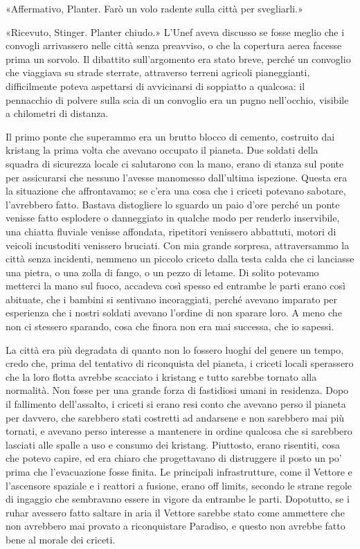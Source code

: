 «Affermativo, Planter. Farò un volo radente sulla città per svegliarli.»

«Ricevuto, Stinger. Planter chiudo.» L'Unef aveva discusso se fosse
meglio che i convogli arrivassero nelle città senza preavviso, o che la
copertura aerea facesse prima un sorvolo. Il dibattito sull'argomento
era stato breve, perché un convoglio che viaggiava su strade sterrate,
attraverso terreni agricoli pianeggianti, difficilmente poteva
aspettarsi di avvicinarsi di soppiatto a qualcosa: il pennacchio di
polvere sulla scia di un convoglio era un pugno nell'occhio, visibile a
chilometri di distanza.

Il primo ponte che superammo era un brutto blocco di cemento, costruito
dai kristang la prima volta che avevano occupato il pianeta. Due soldati
della squadra di sicurezza locale ci salutarono con la mano, erano di
stanza sul ponte per assicurarsi che nessuno l'avesse manomesso
dall'ultima ispezione. Questa era la situazione che affrontavamo; se
c'era una cosa che i criceti potevano sabotare, l'avrebbero fatto.
Bastava distogliere lo sguardo un paio d'ore perché un ponte venisse
fatto esplodere o danneggiato in qualche modo per renderlo inservibile,
una chiatta fluviale venisse affondata, ripetitori venissero abbattuti,
motori di veicoli incustoditi venissero bruciati. Con mia grande
sorpresa, attraversammo la città senza incidenti, nemmeno un piccolo
criceto dalla testa calda che ci lanciasse una pietra, o una zolla di
fango, o un pezzo di letame. Di solito potevamo metterci la mano sul
fuoco, accadeva così spesso ed entrambe le parti erano così abituate,
che i bambini si sentivano incoraggiati, perché avevano imparato per
esperienza che i nostri soldati avevano l'ordine di non sparare loro. A
meno che non ci stessero sparando, cosa che finora non era mai successa,
che io sapessi.

La città era più degradata di quanto non lo fossero luoghi del genere un
tempo, credo che, prima del tentativo di riconquista del pianeta, i
criceti locali sperassero che la loro flotta avrebbe scacciato i
kristang e tutto sarebbe tornato alla normalità. Non fosse per una
grande forza di fastidiosi umani in residenza. Dopo il fallimento
dell'assalto, i criceti si erano resi conto che avevano perso il pianeta
per davvero, che sarebbero stati costretti ad andarsene e non sarebbero
mai più tornati, e avevano perso interesse a mantenere in ordine
qualcosa che si sarebbero lasciati alle spalle a uso e consumo dei
kristang. Piuttosto, erano risentiti, cosa che potevo capire, ed era
chiaro che progettavano di distruggere il posto un po' prima che
l'evacuazione fosse finita. Le principali infrastrutture, come il
Vettore e l'ascensore spaziale e i reattori a fusione, erano off limits,
secondo le strane regole di ingaggio che sembravano essere in vigore da
entrambe le parti. Dopotutto, se i ruhar avessero fatto saltare in aria
il Vettore sarebbe stato come ammettere che non avrebbero mai provato a
riconquistare Paradiso, e questo non avrebbe fatto bene al morale dei
criceti.

